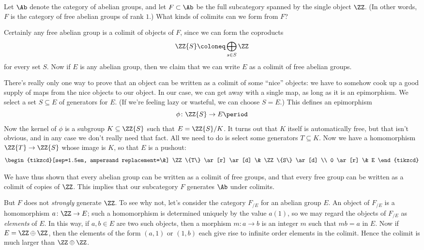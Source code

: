 \begin{eg}
  Let $\Ab$ denote the category of abelian groups, and
  let $F \subset \Ab$ be the full subcategory spanned by the single object $\ZZ$.
  (In other words, $F$ is the category of free abelian groups of rank $1$.)
  What kinds of colimits can we form from $F$?

  Certainly any free abelian group is a colimit of objects of $F$, since we can form the coproducts
  \[
    \ZZ\{S\} \coloneq \bigoplus_{s \in S} \ZZ
  \]
  for every set $S$.
  Now if $E$ is any abelian group, then we claim that we can write $E$ as a colimit of free abelian groups.

  There's really only one way to prove that an object can be written as a colimit of some \enquote{nice} objects:
  we have to somehow cook up a good supply of maps from the nice objects to our object. 
  In our case, we can get away with a single map, as long as it is an epimorphism.
  We select a set $S \subseteq E$ of generators for $E$.
  (If we're feeling lazy or wasteful, we can choose $S = E$.)
  This defines an epimorphism
  \[
    \phi \colon \ZZ\{S\} \to E \period
  \]
  Now the kernel of $\phi$ is a subgroup $K \subseteq \ZZ\{S\}$ such that $E = \ZZ\{S\}/K$.
  It turns out that $K$ itself is automatically free, but
  that isn't obvious, and in any case we don't really need that fact.
  All we need to do is select some generators $T \subseteq K$.
  Now we have a homomorphism $\ZZ\{T\} \to \ZZ\{S\}$ whose image is $K$, so that $E$ is a pushout: 
  \[
    \begin{tikzcd}[sep=1.5em, ampersand replacement=\&]
      \ZZ\{T\} \ar[r] \ar[d] \& \ZZ\{S\} \ar[d] \\
      0        \ar[r]        \& E 
    \end{tikzcd}
  \]
  
  We have thus shown that every abelian group can be written as a colimit of free groups, and that every free group can be written as a colimit of copies of $\ZZ$.
  This implies that our subcategory $F$ generates $\Ab$ under colimits.

  But $F$ does not \emph{strongly} generate $\ZZ$.
  To see why not, let's consider the category $F_{/E}$ for an abelian group $E$.
  An object of $F_{/E}$ is a homomorphism $a \colon \ZZ \to E$;
  such a homomorphism is determined uniquely by the value $a(1)$, so we may regard the objects of $F_{/E}$ as \emph{elements} of $E$.
  In this way, if $a, b \in E$ are two such objects, then
  a morphism $m \colon a \to b$ is an integer $m$ such that $mb = a$ in $E$.
  Now if $E = \ZZ \oplus \ZZ$, then the elements of the form $(a,1)$ or $(1,b)$ each give rise to infinite order elements in the colimit.
  Hence the colimit is much larger than $\ZZ \oplus \ZZ$.
\end{eg}

